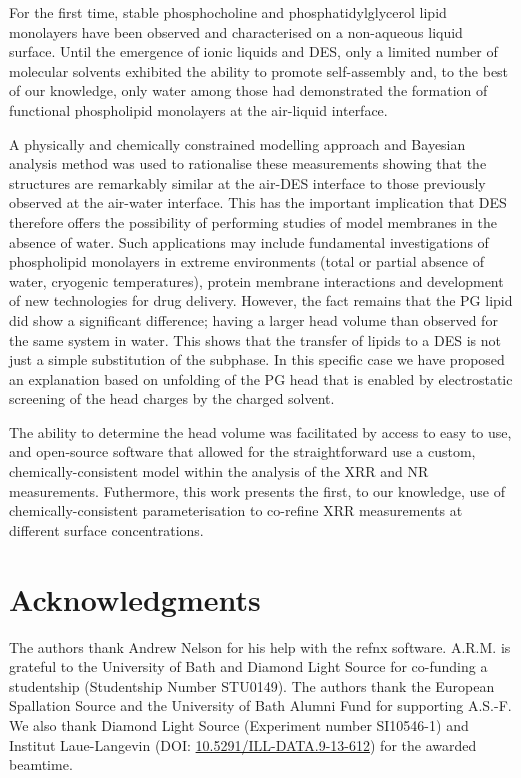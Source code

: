 \documentclass[twocolumn,a4paper]{paper}
\begin{document}
For the first time, stable phosphocholine and phosphatidylglycerol lipid monolayers have been observed and characterised on a non-aqueous liquid surface.
Until the emergence of ionic liquids and DES, only a limited number of molecular solvents exhibited the ability to promote self-assembly and, to the best of our knowledge, only water among those had demonstrated the formation of functional phospholipid monolayers at the air-liquid interface.

A physically and chemically constrained modelling approach and Bayesian analysis method was used to rationalise these measurements showing that the structures are remarkably similar at the air-DES interface to those previously observed at the air-water interface.
This has the important implication that DES therefore offers the possibility of performing studies of model membranes in the absence of water.
Such applications may include fundamental investigations of phospholipid monolayers in extreme environments (total or partial absence of water, cryogenic temperatures), protein membrane interactions and development of new technologies for drug delivery.
However, the fact remains that the PG lipid did show a significant difference; having a larger head volume than observed for the same system in water.
This shows that the transfer of lipids to a DES is not just a simple substitution of the subphase. In this specific case we have proposed an explanation based on unfolding of the PG head that is enabled by electrostatic screening of the head charges by the charged solvent.

The ability to determine the head volume was facilitated by access to easy to use, and open-source software that allowed for the straightforward use a custom, chemically-consistent model within the analysis of the XRR and NR measurements.
Futhermore, this work presents the first, to our knowledge, use of chemically-consistent parameterisation to co-refine XRR measurements at different surface concentrations.

\section*{Acknowledgments}

The authors thank Andrew Nelson for his help with the refnx software.
A.R.M. is grateful to the University of Bath and Diamond Light Source for co-funding a studentship (Studentship Number STU0149).
The authors thank the European Spallation Source and the University of Bath Alumni Fund for supporting A.S.-F.
We also thank Diamond Light Source (Experiment number SI10546-1) and Institut Laue-Langevin (DOI: \href{http://doi.org/10.5291/ILL-DATA.9-13-612}{10.5291/ILL-DATA.9-13-612}) for the awarded beamtime.

\setlength{\bibsep}{1pt}

\end{document}
